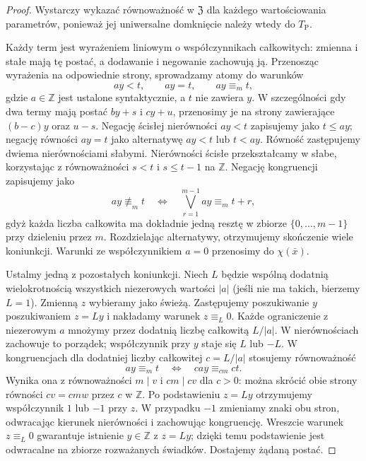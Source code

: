 \begin{proof}
Wystarczy wykazać równoważność w $\mathfrak Z$ dla
każdego wartościowania parametrów, ponieważ jej
uniwersalne domknięcie należy wtedy do $T_{\mathrm P}$.

Każdy term jest wyrażeniem liniowym o współczynnikach
całkowitych: zmienna i stałe mają tę postać, a dodawanie
i negowanie zachowują ją. Przenosząc wyrażenia na
odpowiednie strony, sprowadzamy atomy do warunków
\[
ay<t,\qquad ay=t,\qquad ay\equiv_m t,
\]
gdzie $a\in\mathbb Z$ jest ustalone syntaktycznie,
a $t$ nie zawiera $y$. W szczególności gdy dwa termy
mają postać $by+s$ i $cy+u$, przenosimy je na strony
zawierające $(b-c)y$ oraz $u-s$.
Negację ścisłej nierówności $ay<t$ zapisujemy jako
$t\leq ay$; negację równości $ay=t$ jako alternatywę
$ay<t$ lub $t<ay$.
Równość zastępujemy dwiema nierównościami słabymi.
Nierówności ścisłe przekształcamy w słabe,
korzystając z równoważności $s<t$ i $s\leq t-1$ na
$\mathbb Z$. Negację kongruencji zapisujemy jako
\[
ay\not\equiv_m t
\quad\Longleftrightarrow\quad
\bigvee_{r=1}^{m-1} ay\equiv_m t+r,
\]
gdyż każda liczba całkowita ma dokładnie jedną
resztę w zbiorze $\{0,\ldots,m-1\}$ przy dzieleniu
przez $m$. Rozdzielając alternatywy, otrzymujemy
skończenie wiele koniunkcji. Warunki ze współczynnikiem
$a=0$ przenosimy do $\chi(\bar x)$.

Ustalmy jedną z pozostałych koniunkcji. Niech $L$
będzie wspólną dodatnią wielokrotnością wszystkich
niezerowych wartości $|a|$ (jeśli nie ma takich,
bierzemy $L=1$). Zmienną $z$ wybieramy jako świeżą.
Zastępujemy poszukiwanie $y$ poszukiwaniem $z=Ly$
i nakładamy warunek $z\equiv_L0$. Każde ograniczenie z niezerowym
$a$ mnożymy przez dodatnią liczbę całkowitą $L/|a|$.
W nierównościach zachowuje to porządek; współczynnik
przy $y$ staje się $L$ lub $-L$. W kongruencjach
dla dodatniej liczby całkowitej $c=L/|a|$ stosujemy
równoważność
\[
ay\equiv_m t\quad\Longleftrightarrow\quad
cay\equiv_{cm}ct.
\]
Wynika ona z równoważności $m\mid v$ i $cm\mid cv$
dla $c>0$: można skrócić obie strony równości
$cv=cmw$ przez $c$ w $\mathbb Z$.
Po podstawieniu $z=Ly$ otrzymujemy współczynnik
$1$ lub $-1$ przy $z$. W przypadku $-1$ zmieniamy
znaki obu stron, odwracając kierunek nierówności
i zachowując kongruencję.
Wreszcie warunek $z\equiv_L0$ gwarantuje istnienie
$y\in\mathbb Z$ z $z=Ly$; dzięki temu podstawienie
jest odwracalne na zbiorze rozważanych świadków.
Dostajemy żądaną postać.
\end{proof}

